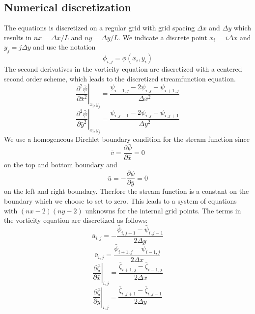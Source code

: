 \subsection{Numerical discretization}
The equations is discretized on a regular grid with grid spacing $\Delta x$ and $\Delta y$ which results in $nx = \Delta x /L $ and $ny = \Delta y / L$. We indicate a discrete point $x_i$ = $i \Delta x$ and $y_j = j \Delta y$  and use the notation
\begin{equation}
\phi_{i,j} = \phi(x_i,y_i)
\end{equation} 
The second derivatives in the vorticity equation are discretized with a centered second order scheme, which leads to the discretized streamfunction equation.
\begin{equation}
\left. \frac{\partial^2 \bar{\psi}}{\partial \bar{x}^2}\right|_{x_i,y_j} = \frac{\psi_{i-1,j} - 2 \psi_{i,j} + \psi_{i+1,j}}{\Delta x^2}
\end{equation}
\begin{equation}
\left. \frac{\partial^2 \bar{\psi}}{\partial \bar{y}^2}\right|_{x_i,y_j} = \frac{\psi_{i,j-1} - 2 \psi_{i,j} + \psi_{i,j+1}}{\Delta y^2}
\end{equation}
We use a homogeneous Dirchlet boundary condition for the stream function since
\begin{equation}
\bar{v} = \frac{\partial \bar{\psi}}{\partial \bar{x}} = 0
\end{equation}
on the top and bottom boundary and
\begin{equation}
\bar{u} = -\frac{\partial \bar{\psi}}{\partial \bar{y}} = 0
\end{equation}
on the left and right boundary. Therfore the stream function is a constant on the boundary which we choose to set to zero. This leads to a system of equations with $(nx-2)(ny-2)$ unknowns for the internal grid points. 
The terms in the vorticity equation are discretized as follows:
\begin{equation}
\bar{u}_{i,j} = - \frac{\bar{\psi}_{i,j+1} - \bar{\psi}_{i,j-1}}{2 \Delta y}
\end{equation}
\begin{equation}
\bar{v}_{i,j} = \frac{\bar{\psi}_{i+1,j} - \bar{\psi}_{i-1,j}}{2 \Delta x}
\end{equation}
\begin{equation}
\left. \frac{\partial \bar{\zeta}}{\partial \bar{x}} \right|_{i,j} = \frac{\bar{\zeta}_{i+1,j}- \bar{\zeta}_{i-1,j}}{2 \Delta x}
\end{equation}
\begin{equation}
\left. \frac{\partial \bar{\zeta}}{\partial \bar{y}} \right|_{i,j} = \frac{\bar{\zeta}_{i,j+1}- \bar{\zeta}_{i,j-1}}{2 \Delta y}
\end{equation}
